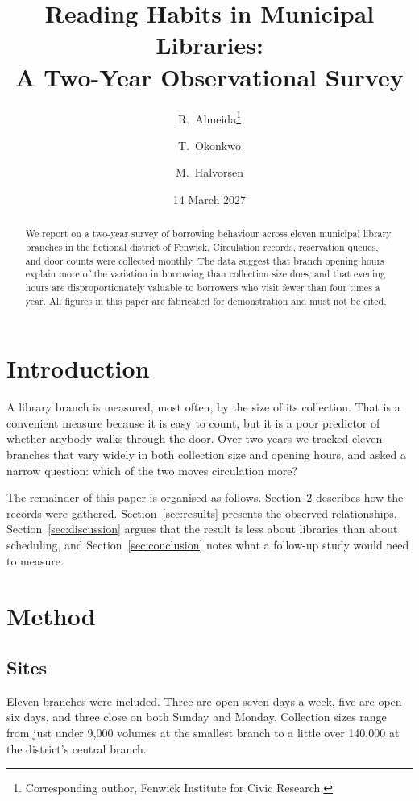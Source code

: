 \documentclass[11pt,a4paper]{article}
\title{Reading Habits in Municipal Libraries:\\
       A Two-Year Observational Survey}
\author{R.\ Almeida\thanks{Corresponding author, Fenwick Institute for Civic
        Research.} \and T.\ Okonkwo \and M.\ Halvorsen}
\date{14 March 2027}
\begin{document}
\maketitle

\begin{abstract}
We report on a two-year survey of borrowing behaviour across eleven municipal
library branches in the fictional district of Fenwick. Circulation records,
reservation queues, and door counts were collected monthly. The data suggest
that branch opening hours explain more of the variation in borrowing than
collection size does, and that evening hours are disproportionately valuable to
borrowers who visit fewer than four times a year. All figures in this paper are
fabricated for demonstration and must not be cited.
\end{abstract}

\tableofcontents

\section{Introduction}
\label{sec:intro}

A library branch is measured, most often, by the size of its collection. That is
a convenient measure because it is easy to count, but it is a poor predictor of
whether anybody walks through the door. Over two years we tracked eleven
branches that vary widely in both collection size and opening hours, and asked a
narrow question: which of the two moves circulation more?

The remainder of this paper is organised as follows. Section~\ref{sec:method}
describes how the records were gathered. Section~\ref{sec:results} presents the
observed relationships. Section~\ref{sec:discussion} argues that the result is
less about libraries than about scheduling, and Section~\ref{sec:conclusion}
notes what a follow-up study would need to measure.

\section{Method}
\label{sec:method}

\subsection{Sites}

Eleven branches were included. Three are open seven days a week, five are open
six days, and three close on both Sunday and Monday. Collection sizes range from
just under 9{,}000 volumes at the smallest branch to a little over 140{,}000 at
the district's central branch.
\end{document}
